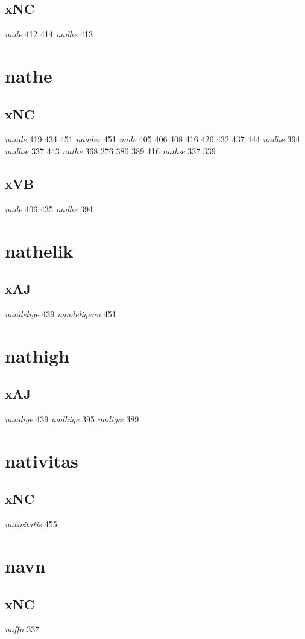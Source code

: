 \documentclass[a4paper,twocolumn]{article}
\begin{document}
\subsection{xNC}
\label{sec:orge6ccc8c}
\emph{nade} 412 414 \emph{nadhe} 413 
\section{nathe}
\label{sec:org10901a1}
\subsection{xNC}
\label{sec:orgfa69622}
\emph{naade} 419 434 451 \emph{naader} 451 \emph{nade} 405 406 408 416 426 432 437 444 \emph{nadhe} 394 \emph{nadhæ} 337 443 \emph{nathe} 368 376 380 389 416 \emph{nathæ} 337 339 
\subsection{xVB}
\label{sec:orgabbaa84}
\emph{nade} 406 435 \emph{nadhe} 394 
\section{nathelik}
\label{sec:org88135ca}
\subsection{xAJ}
\label{sec:org658092a}
\emph{naadelige} 439 \emph{naadeligenn} 451 
\section{nathigh}
\label{sec:orgd14da91}
\subsection{xAJ}
\label{sec:orgd005682}
\emph{naadige} 439 \emph{nadhige} 395 \emph{nadigæ} 389 
\section{nativitas}
\label{sec:org83f2da0}
\subsection{xNC}
\label{sec:org1fbbbc5}
\emph{nativitatis} 455 
\section{navn}
\label{sec:org1fafdd3}
\subsection{xNC}
\label{sec:orgf9acc1b}
\emph{naffn} 337 
\end{document}

